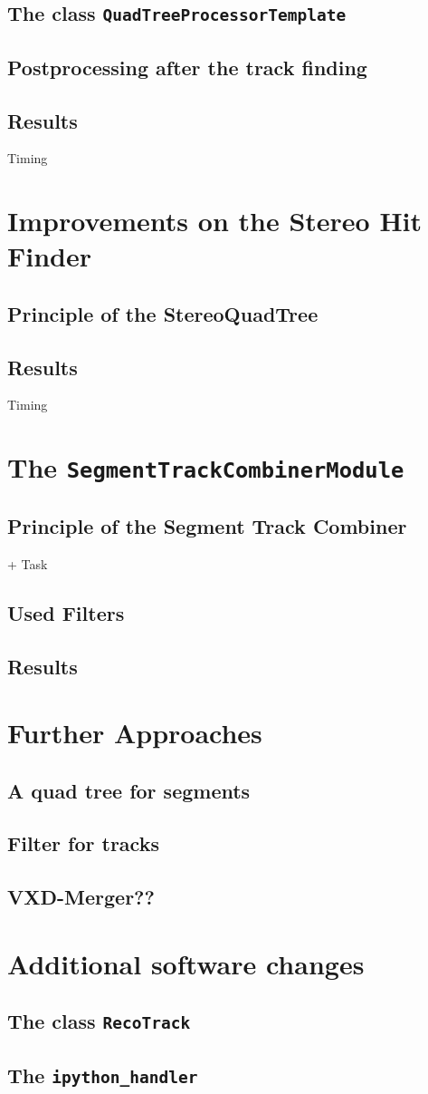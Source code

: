 \subsection{The class \texttt{QuadTreeProcessorTemplate}}
\subsection{Postprocessing after the track finding}
\subsection{Results}
Timing

\section{Improvements on the Stereo Hit Finder}
\subsection{Principle of the StereoQuadTree}
\subsection{Results}
Timing

\section{The \texttt{SegmentTrackCombinerModule}}
\subsection{Principle of the Segment Track Combiner}
+ Task
\subsection{Used Filters}
\subsection{Results}

\section{Further Approaches}
\subsection{A quad tree for segments}
\subsection{Filter for tracks}
\subsection{VXD-Merger??}

\section{Additional software changes}
\subsection{The class \texttt{RecoTrack}}
\subsection{The \texttt{ipython\_handler}}